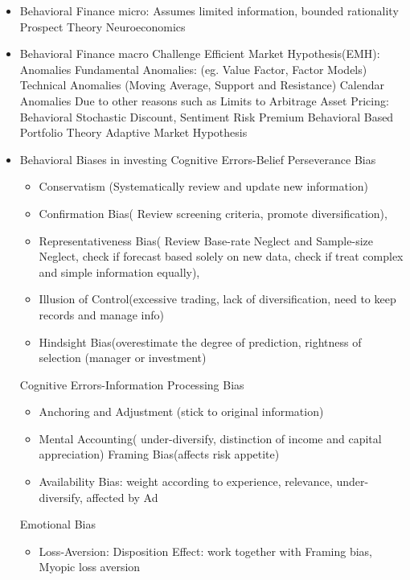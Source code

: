 \documentclass[11pt, openany]{book}              %
\begin{document}
\begin{itemize}
    \item Behavioral Finance micro: Assumes limited information, bounded rationality
    	\subitem Prospect Theory
    	\subitem Neuroeconomics
    \item Behavioral Finance macro
    	\subitem Challenge Efficient Market Hypothesis(EMH): Anomalies
    		\subsubitem Fundamental Anomalies: (eg. Value Factor, Factor Models)
    		\subsubitem Technical Anomalies (Moving Average, Support and Resistance)
    		\subsubitem Calendar Anomalies
    		\subsubitem Due to other reasons such as Limits to Arbitrage
    	\subitem Asset Pricing: Behavioral Stochastic Discount, Sentiment Risk Premium
    	\subitem Behavioral Based Portfolio Theory
    	\subitem Adaptive Market Hypothesis
    \item Behavioral Biases in investing
    	\subitem Cognitive Errors-Belief Perseverance Bias 
    		\begin{itemize}
    		\item Conservatism (Systematically review and update new information)
    		\item Confirmation Bias( Review screening criteria, promote diversification),
    		\item Representativeness Bias( Review Base-rate Neglect and Sample-size Neglect, check if forecast based solely on new data, check if treat complex and simple information equally),
    		\item Illusion of Control(excessive trading, lack of diversification, need to keep records and manage info)
    		\item Hindsight Bias(overestimate the degree of prediction, rightness of selection (manager or investment)
    		\end{itemize}
    	\subitem  Cognitive Errors-Information Processing Bias 
    		\begin{itemize}
    		\item Anchoring and Adjustment (stick to original information)
    		\item Mental Accounting( under-diversify, distinction of income and capital appreciation) Framing Bias(affects risk appetite)
    		\item Availability Bias: weight according to experience, relevance, under-diversify, affected by Ad
    		\end{itemize}
    	\subitem Emotional Bias
    		\begin{itemize}
    		\item Loss-Aversion: Disposition Effect: work together with Framing bias, Myopic loss aversion

\end{itemize}
\end{itemize}
\end{document}
